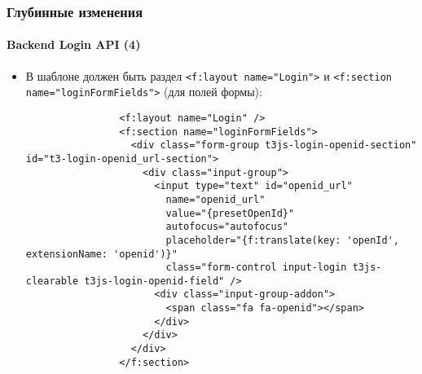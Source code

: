 \begin{frame}[fragile]
	\frametitle{Глубинные изменения}
	\framesubtitle{Backend Login API (4)}

	\lstset{basicstyle=\tiny\ttfamily}

	\begin{itemize}

		\item В шаблоне должен быть раздел \texttt{<f:layout name="Login">} и
			\texttt{<f:section name="loginFormFields">} (для полей формы):

			\begin{lstlisting}
				<f:layout name="Login" />
				<f:section name="loginFormFields">
				  <div class="form-group t3js-login-openid-section" id="t3-login-openid_url-section">
				    <div class="input-group">
				      <input type="text" id="openid_url"
				        name="openid_url"
				        value="{presetOpenId}"
				        autofocus="autofocus"
				        placeholder="{f:translate(key: 'openId', extensionName: 'openid')}"
				        class="form-control input-login t3js-clearable t3js-login-openid-field" />
				      <div class="input-group-addon">
				        <span class="fa fa-openid"></span>
				      </div>
				    </div>
				  </div>
				</f:section>
			\end{lstlisting}

	\end{itemize}

\end{frame}


